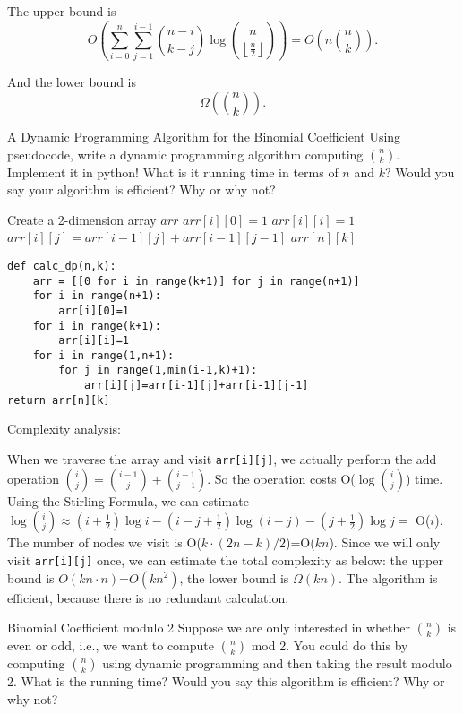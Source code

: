 \documentclass[UTF8, a4paper, linespread=1.5]{article}
\begin{document}
The upper bound is
$$O(\sum_{i=0}^n\sum_{j=1}^{i-1} \binom {n-i}{k-j} \log  \binom n {\left\lfloor \frac{n}{2} \right\rfloor }) = O(n \binom n k).$$

And the lower bound is
$$\Omega(\binom nk).$$
\newpage
\begin{thm}{A Dynamic Programming Algorithm for the Binomial Coefficient}{}
    Using pseudocode, 
    write a dynamic programming algorithm computing  $\binom{n}{k}$.  Implement it in python!  What is it running 
    time in terms of $n$ and $k$? Would you say your algorithm is efficient?  Why or why not?
    
\end{thm}
\begin{algorithm}
    \caption{Caluculate Binomial Coefficient Using DP}
    \begin{algorithmic}
        \STATE Create a 2-dimension array $arr$
        \STATE $arr[i][0]=1$
        \ENDFOR
        \STATE $arr[i][i]=1$
        \ENDFOR
        \STATE $arr[i][j]=arr[i-1][j]+arr[i-1][j-1]$
        \ENDFOR
        \ENDFOR
        \RETURN $arr[n][k]$
    \end{algorithmic}
\end{algorithm}
\begin{verbatim}
def calc_dp(n,k):
    arr = [[0 for i in range(k+1)] for j in range(n+1)]
    for i in range(n+1):
        arr[i][0]=1
    for i in range(k+1):
        arr[i][i]=1
    for i in range(1,n+1):
        for j in range(1,min(i-1,k)+1):
            arr[i][j]=arr[i-1][j]+arr[i-1][j-1]
return arr[n][k]
\end{verbatim}
Complexity analysis:

 When we traverse the array and visit \texttt{arr[i][j]}, we actually perform the add operation $\binom{i}{j}=\binom{i-1}{j}+\binom{i-1}{j-1}$. So the operation costs O($\log\binom{i}{j}$) time. Using the Stirling Formula, we can estimate $\log\binom{i}{j}\approx(i+\frac{1}{2})\log i-(i-j+\frac{1}{2})\log (i-j)-(j+\frac{1}{2})\log j =$ O($i$). The number of nodes we visit is O($k\cdot (2n-k)/2$)=O($kn$). Since we will only visit \texttt{arr[i][j]} once, we can estimate the total complexity as below: the upper bound is $O(kn\cdot n)$=$O(kn^2)$, the lower bound is $\Omega(kn)$. The algorithm is efficient, because there is no redundant calculation.
 
 \newpage
 \begin{thm}{Binomial Coefficient modulo 2}{}
     Suppose we are only interested in whether $\binom{n}{k}$ is even or odd, i.e., we want to compute $\binom{n}{k}$ mod 2. You could do this by computing  $\binom{n}{k}$ using dynamic programming and then taking the result modulo 2. What is the running time? Would you say this algorithm is efficient? Why or why not?
    
 \end{thm}
\end{document}

